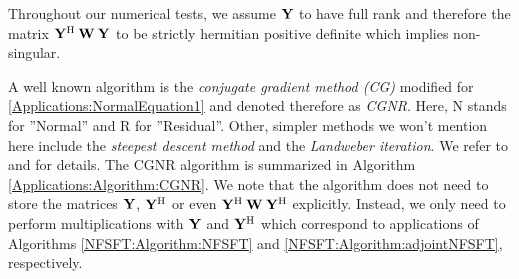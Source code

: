   \begin{remark}
    Throughout our numerical tests, we assume $\mathbf{Y}$ to have full rank and therefore
    the matrix $\mathbf{Y^{\text{\rm{H}}}} \: \mathbf{W} \: \mathbf{Y}$ to be strictly hermitian positive definite
    which implies non-singular.
  \end{remark}
  
  A well known algorithm is the \emph{conjugate gradient method (CG)} modified for 
  \eqref{Applications:NormalEquation1} and denoted therefore as \emph{CGNR}. Here, N stands 
  for ''Normal'' and R for ''Residual''. Other, simpler methods we won't mention here
  include the \emph{steepest descent method} and the \emph{Landweber iteration}. We 
  refer to \cite{bjoerk} and \cite{golo} for details. The CGNR algorithm is summarized in 
  Algorithm \ref{Applications:Algorithm:CGNR}. We note that the algorithm does not 
  need to store the matrices $\mathbf{Y}$, $\mathbf{Y}^{\text{\rm{H}}}$ or even $\mathbf{Y}^{\text{\rm{H}}} \: \mathbf{W} \:
  \mathbf{Y}^{\text{\rm{H}}}$ explicitly. Instead, we only need to perform multiplications with 
  $\mathbf{Y}$ and $\mathbf{Y}^{\text{\rm{H}}}$ which correspond to applications of Algorithms 
  \ref{NFSFT:Algorithm:NFSFT} and \ref{NFSFT:Algorithm:adjointNFSFT}, respectively.
  
